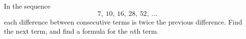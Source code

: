 In the sequence
\[7,\ 10,\ 16,\ 28,\ 52,\ \dots\]
each difference between consecutive terms is twice the previous difference. Find the next term, and find a formula for the $n$th term.
